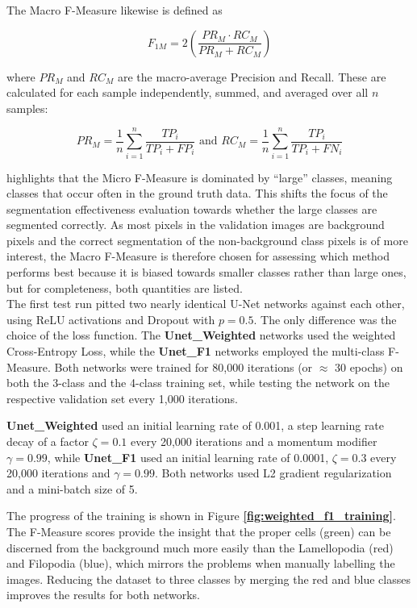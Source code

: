 \noindent The Macro F-Measure likewise is defined as

\[ F_{1M} = 2 \left ( \frac{PR_M \cdot RC_M}{PR_M + RC_M} \right ) \]

\noindent where $PR_M$ and $RC_M$ are the macro-average Precision and Recall. These are calculated for each sample independently, summed, and averaged over all $n$ samples:

\[ PR_M = \frac{1}{n} \sum_{i=1}^{n} \frac{TP_i}{TP_i + FP_i} \text { and } RC_M = \frac{1}{n} \sum_{i=1}^{n} \frac{TP_i}{TP_i + FN_i} \] 

\noindent \cite[pp. 317-318]{information_retrieval} highlights that the Micro F-Measure is dominated by ``large'' classes, meaning classes that occur often in the ground truth data. This shifts the focus of the segmentation effectiveness evaluation towards whether the large classes are segmented correctly. As most pixels in the validation images are background pixels and the correct segmentation of the non-background class pixels is of more interest, the Macro F-Measure is therefore chosen for assessing which method performs best because it is biased towards smaller classes rather than large ones, but for completeness, both quantities are listed.\\

\noindent The first test run pitted two nearly identical U-Net networks against each other, using ReLU activations and Dropout with $p = 0.5$. The only difference was the choice of the loss function. The \textbf{Unet\_Weighted} networks used the weighted Cross-Entropy Loss, while the \textbf{Unet\_F1} networks employed the multi-class F-Measure. Both networks were trained for 80,000 iterations (or $\approx$ 30 epochs) on both the 3-class and the 4-class training set, while testing the network on the respective validation set every 1,000 iterations.

\textbf{Unet\_Weighted} used an initial learning rate of 0.001, a step learning rate decay of a factor $\zeta = 0.1$ every 20,000 iterations and a momentum modifier $\gamma = 0.99$, while \textbf{Unet\_F1} used an initial learning rate of 0.0001, $\zeta = 0.3$ every 20,000 iterations and $\gamma = 0.99$. Both networks used L2 gradient regularization and a mini-batch size of 5.

The progress of the training is shown in Figure \textbf{\ref{fig:weighted_f1_training}}. The F-Measure scores provide the insight that the proper cells (green) can be discerned from the background much more easily than the Lamellopodia (red) and Filopodia (blue), which mirrors the problems when manually labelling the images. Reducing the dataset to three classes by merging the red and blue classes improves the results for both networks.\\

